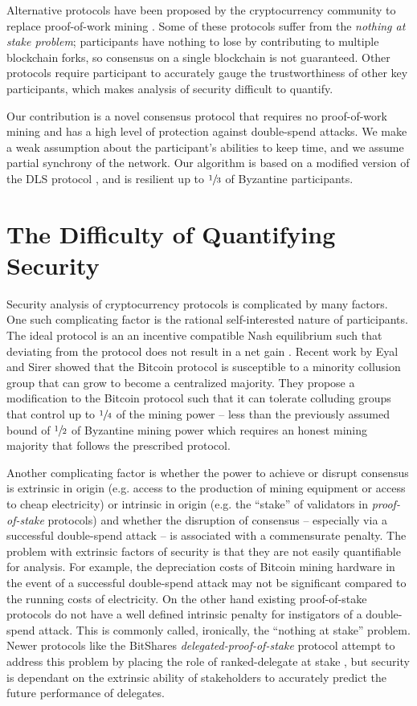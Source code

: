 \documentclass[letter,11pt]{article}
\begin{document}
Alternative protocols have been proposed by the cryptocurrency community to replace proof-of-work mining \cite{conf:nxt, conf:bitshares}. Some of these protocols suffer from the \textit{nothing at stake problem}; participants have nothing to lose by contributing to multiple blockchain forks, so consensus on a single blockchain is not guaranteed. Other protocols require participant to accurately gauge the trustworthiness of other key participants, which makes analysis of security difficult to quantify.

Our contribution is a novel consensus protocol that requires no proof-of-work mining and has a high level of protection against double-spend attacks. We make a weak assumption about the participant’s abilities to keep time, and we assume partial synchrony of the network. Our algorithm is based on a modified version of the DLS protocol \cite{article:dwork}, and is resilient up to $\sfrac{1}{3}$ of Byzantine participants.

\section{The Difficulty of Quantifying Security} %

Security analysis of cryptocurrency protocols is complicated by many factors. One such complicating factor is the rational self-interested nature of participants. The ideal protocol is an an incentive compatible Nash equilibrium such that deviating from the protocol does not result in a net gain \cite{article:kroll}. Recent work by Eyal and Sirer \cite{article:eyal} showed that the Bitcoin protocol is susceptible to a minority collusion group that can grow to become a centralized majority. They propose a modification to the Bitcoin protocol such that it can tolerate colluding groups that control up to $\sfrac{1}{4}$ of the mining power – less than the previously assumed bound of $\sfrac{1}{2}$ of Byzantine mining power which requires an honest mining majority that follows the prescribed protocol.

Another complicating factor is whether the power to achieve or disrupt consensus is extrinsic in origin (e.g. access to the production of mining equipment or access to cheap electricity) or intrinsic in origin (e.g. the “stake” of validators in \textit{proof-of-stake} protocols) and whether the disruption of consensus – especially via a successful double-spend attack – is associated with a commensurate penalty. The problem with extrinsic factors of security is that they are not easily quantifiable for analysis. For example, the depreciation costs of Bitcoin mining hardware in the event of a successful double-spend attack may not be significant compared to the running costs of electricity. On the other hand existing proof-of-stake protocols do not have a well defined intrinsic penalty for instigators of a double-spend attack. This is commonly called, ironically, the “nothing at stake” problem. Newer protocols like the BitShares \textit{delegated-proof-of-stake} protocol attempt to address this problem by placing the role of ranked-delegate at stake \cite{conf:bitshares}, but security is dependant on the extrinsic ability of stakeholders to accurately predict the future performance of delegates.
\end{document}
